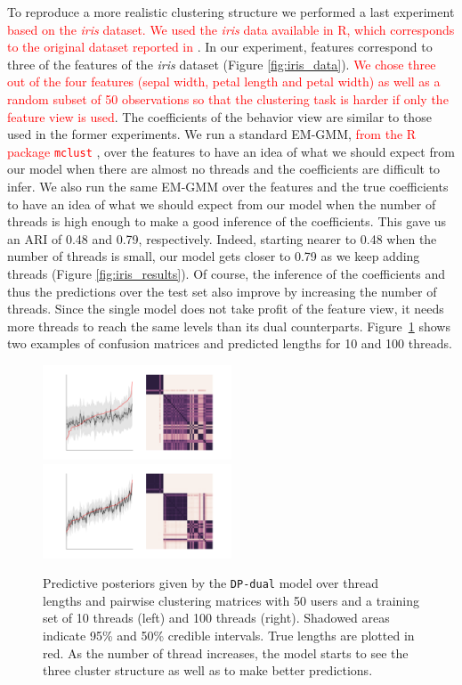 \documentclass[smallextended]{svjour3}          %
\newcommand\alberto[1]{\textcolor{red}{#1}}
\begin{document}
To reproduce a more realistic clustering structure we performed a last experiment \alberto{based on the \textit{iris} dataset. We used the \textit{iris} data available in R, which corresponds to the original dataset reported in \cite{IrisData1935}}. In our experiment, features correspond to three of the features of the \textit{iris} dataset (Figure \ref{fig:iris_data}). \alberto{We chose three out of the four features (sepal width, petal length and petal width) as well as a random subset of 50 observations so that the clustering task is harder if only the feature view is used}. The coefficients of the behavior view are similar to those used in the former experiments. We run a standard EM-GMM, \alberto{from the R package \texttt{mclust} \citep{mclust}}, over the features to have an idea of what we should expect from our model when there are almost no threads and the coefficients are difficult to infer. We also run the same EM-GMM over the features and the true coefficients to have an idea of what we should expect from our model when the number of threads is high enough to make a good inference of the coefficients. This gave us an ARI of 0.48 and 0.79, respectively. Indeed, starting nearer to 0.48 when the number of threads is small, our model gets closer to 0.79 as we keep adding threads (Figure \ref{fig:iris_results}). Of course, the inference of the coefficients and thus the predictions over the test set also improve by increasing the number of threads. Since the single model does not take profit of the feature view, it needs more threads to reach the same levels than its dual counterparts. Figure~\ref{fig:iris_posteriors} shows two examples of confusion matrices and predicted lengths for 10 and 100 threads.
\begin{figure}
	\centering
	\includegraphics[width=0.5\textwidth]{Fig9_iris_posterior_10}%
	\includegraphics[width=0.5\textwidth]{Fig9_iris_posterior_100}
	\caption{Predictive posteriors given by the \texttt{DP-dual} model over thread lengths and pairwise clustering matrices with 50 users and a training set of 10 threads (left) and 100 threads (right). Shadowed areas indicate 95\% and 50\% credible intervals. True lengths are plotted in red. As the number of thread increases, the model starts to see the three cluster structure as well as to make better predictions.}
	\label{fig:iris_posteriors}
\end{figure}
\end{document}

